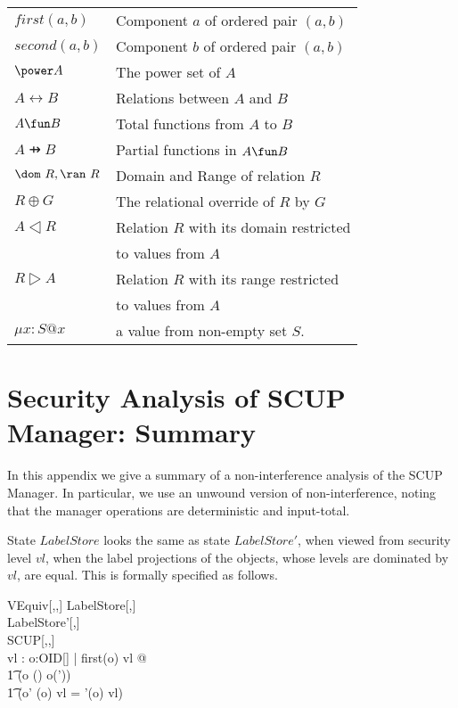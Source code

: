 \begin{center}
\begin{tabular}{ll}
$first(a,b)$ & Component $a$ of ordered pair $(a,b)$\\
$second(a,b)$ & Component $b$ of ordered pair $(a,b)$
\\
$\power A$  & The power set of $A$ \\
$A \rel B$  & Relations between $A$ and $B$\\
$A \fun B$  &  Total functions from $A$ to $B$\\
$A \pfun B$ & Partial functions in $A\fun B$\\
$\dom~R, \ran~R$ & Domain and Range of relation $R$
\\
 $R\oplus G$ & The relational override of $R$ by $G$\\
$A\dres R$ & Relation $R$ with its domain restricted \\
           & to values from $A$\\
$R\rres A$ & Relation $R$ with its range restricted \\
           & to values from $A$\\
$\mu x:S @ x$ & a value from non-empty set $S$. 
\end{tabular}
\end{center}




\section{Security Analysis of SCUP Manager: Summary} \label{a:noni}

In this appendix we give a summary of a non-interference analysis
\cite{GandM84,rushby:sri:92} of
the SCUP Manager. In particular, we use an unwound version of 
non-interference, noting that the manager operations are deterministic and
input-total. 

State $LabelStore$ looks  the same as state $LabelStore'$, when viewed
from security level $vl$, when the label projections of the objects, whose
levels are dominated by $vl$, are equal. This is formally specified as follows.  
\begin{schema}{VEquiv[\LEVEL,\LABEL,\FID]} 
LabelStore[\LEVEL,\LABEL]\\
LabelStore'[\LEVEL,\LABEL]\\
SCUP[\LEVEL,\LABEL,\FID]\\
vl : \LEVEL
\where
\forall o:OID[\LEVEL] | first(o) \fleq vl @ 
\\
\t1 (o \in \dom(\delta) \iff o\in \dom(\delta')) 
\land \\
\t1 (o\in \dom \delta \cap \dom \delta' \implies 
\delta(o) \lproj vl = \delta'(o) \lproj vl)
\end{schema}

